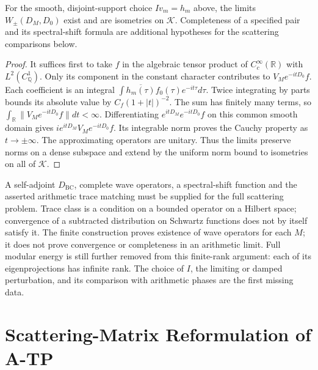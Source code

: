 \begin{proposition}
\label{v4-arith:w7-j:prop:wave-existence}
For the smooth, disjoint-support choice \(Iv_m=h_m\) above, the limits
\(W_\pm(D_M,D_0)\) exist and are isometries on \(\mathcal K\).
Completeness of a specified pair and its spectral-shift formula are
additional hypotheses for the scattering comparisons below.
\end{proposition}
\begin{proof}
It suffices first to take \(f\) in the algebraic tensor product of
\(C_c^\infty(\mathbb R)\) with \(L^2(C_{\mathbb Q}^1)\). Only its
component in the constant character contributes to \(V_M e^{-itD_0}f\).
Each coefficient is an integral
\(\int\overline{h_m(\tau)}f_0(\tau)e^{-it\tau}d\tau\).
Twice integrating by parts bounds its absolute value by
\(C_f(1+|t|)^{-2}\). The sum has finitely many terms, so
\(\int_\mathbb R\|V_Me^{-itD_0}f\|dt<\infty\).
Differentiating \(e^{itD_M}e^{-itD_0}f\) on this common smooth domain
gives \(i e^{itD_M}V_Me^{-itD_0}f\). Its integrable norm proves the
Cauchy property as \(t\to\pm\infty\). The approximating operators are
unitary. Thus the limits preserve norms on a dense subspace and extend
by the uniform norm bound to isometries on all of \(\mathcal K\).
\end{proof}

\begin{remark}
\label{v4-arith:w7-j:rem:trace-class-domain}
A self-adjoint \(D_{\mathrm{BC}}\), complete wave operators, a
spectral-shift function and the asserted arithmetic trace matching
must be supplied for the full scattering problem. Trace class is a
condition on a bounded operator on a Hilbert space; convergence of a
subtracted distribution on Schwartz functions does not by itself
satisfy it. The finite construction proves existence of wave operators
for each \(M\); it does not prove convergence or completeness in an
arithmetic limit. Full modular energy is still further removed from
this finite-rank argument: each of its eigenprojections has infinite
rank. The choice of \(I\), the limiting or damped perturbation, and its
comparison with arithmetic phases are the first missing data.
\end{remark}

\section{Scattering-Matrix Reformulation of A-TP}
\label{v4-arith:w7-j:reformulation}

